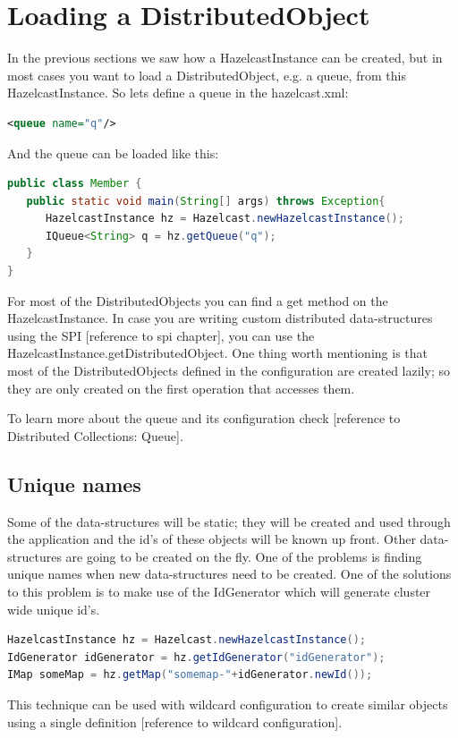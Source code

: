 \section{Loading a DistributedObject}
In the previous sections we saw how a HazelcastInstance can be created, but in most cases you want to load a DistributedObject, e.g. a queue, from this HazelcastInstance. So lets define a queue in the hazelcast.xml:
\begin{lstlisting}[language=xml]
<queue name="q"/>
\end{lstlisting}
And the queue can be loaded like this:
\begin{lstlisting}[language=java]
public class Member {
   public static void main(String[] args) throws Exception{
      HazelcastInstance hz = Hazelcast.newHazelcastInstance();
      IQueue<String> q = hz.getQueue("q");
   }
}
\end{lstlisting}
For most of the DistributedObjects you can find a get method on the HazelcastInstance. In case you are writing custom distributed data-structures using the SPI [reference to spi chapter], you can use the HazelcastInstance.getDistributedObject. One thing worth mentioning is that most of the DistributedObjects defined in the configuration are created lazily; so they are only created on the first operation that accesses them.

To learn more about the queue and its configuration check [reference to Distributed Collections: Queue].
\subsection{Unique names}
Some of the data-structures will be static; they will be created and used through the application and the id's of these objects will be known up front. Other data-structures are going to be created on the fly. One of the problems is finding unique names when new data-structures need to be created. One of the solutions to this problem is to make use of the IdGenerator which will generate cluster wide unique id's. 

\begin{lstlisting}[language=java]
HazelcastInstance hz = Hazelcast.newHazelcastInstance();
IdGenerator idGenerator = hz.getIdGenerator("idGenerator");
IMap someMap = hz.getMap("somemap-"+idGenerator.newId());
\end{lstlisting}
This technique can be used with wildcard configuration to create similar objects using a single definition [reference to wildcard configuration]. 

